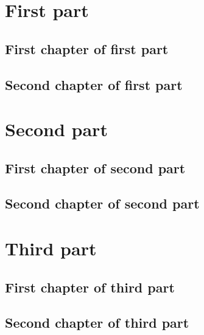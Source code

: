 \documentclass[a4paper,oneside,12pt]{book}
\begin{document}
\setvruler[1cm][0][10][3][0][0pt][0pt][0pt][] %
\doparttoc \faketableofcontents
\part{First part}
\parttoc
\chapter{First chapter of first part} \chapter{Second chapter of first part}
\part{Second part}
\renewcommand{\mtcgapbeforeheads}{100pt}
\renewcommand{\mtcgapafterheads}{80pt}
\parttoc
\chapter{First chapter of second part} \chapter{Second chapter of second part}
\part{Third part}
\renewcommand{\mtcgapbeforeheads}{20pt}
\renewcommand{\mtcgapafterheads}{10pt}
\parttoc
\chapter{First chapter of third part} \chapter{Second chapter of third part}
\end{document}

